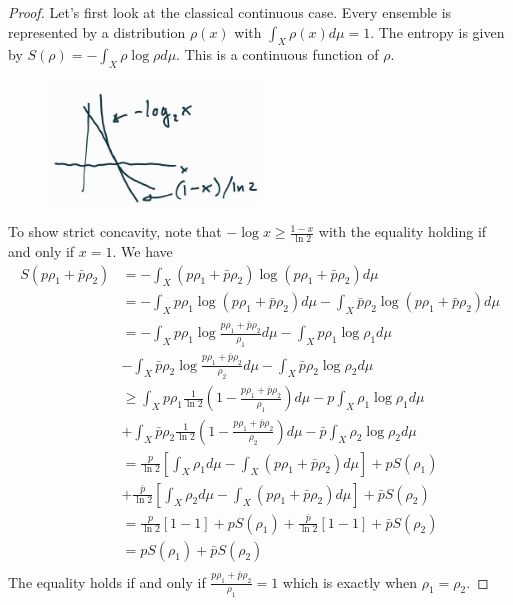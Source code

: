 \begin{proof}
	Let's first look at the classical continuous case. Every ensemble is represented by a distribution $\rho(x)$ with $\int_X \rho(x) d\mu=1$. The entropy is given by $S(\rho) = - \int_X \rho \log \rho d\mu$. This is a continuous function of $\rho$.
	
\begin{figure}[h]
	\centering
	\includegraphics[width=0.5\textwidth]{tempimages/LogBound.jpg}
\end{figure}
	
	To show strict concavity, note that $- \log x \geq \frac{1-x}{\ln 2}$ with the equality holding if and only if $x=1$. We have
	\begin{equation}
		\begin{aligned}
			S(p\rho_1 + \bar{p}\rho_2) &= - \int_X \left(p\rho_1 + \bar{p}\rho_2\right) \log \left(p\rho_1 + \bar{p}\rho_2\right) d\mu \\
			&= - \int_X p\rho_1 \log \left(p\rho_1 + \bar{p}\rho_2\right) d\mu - \int_X \bar{p}\rho_2 \log \left(p\rho_1 + \bar{p}\rho_2\right) d\mu \\
			&= - \int_X p\rho_1 \log \frac{p\rho_1 + \bar{p}\rho_2}{\rho_1} d\mu - \int_X p\rho_1 \log \rho_1 d\mu \\
			&- \int_X \bar{p}\rho_2 \log \frac{p\rho_1 + \bar{p}\rho_2}{\rho_2} d\mu - \int_X \bar{p}\rho_2 \log \rho_2 d\mu \\
			&\geq \int_X p\rho_1 \frac{1}{\ln 2} \left(1 - \frac{p\rho_1 + \bar{p}\rho_2}{\rho_1} \right)   d\mu - p \int_X \rho_1 \log \rho_1 d\mu \\
			&+ \int_X \bar{p}\rho_2 \frac{1}{\ln 2} \left(1 - \frac{p\rho_1 + \bar{p}\rho_2}{\rho_2} \right)   d\mu - \bar{p} \int_X \rho_2 \log \rho_2 d\mu \\
			&= \frac{p}{\ln 2}\left[ \int_X \rho_1 d\mu - \int_X \left(p\rho_1 + \bar{p}\rho_2\right) d\mu  \right] + p S(\rho_1) \\
			&+ \frac{\bar{p}}{\ln 2}\left[ \int_X \rho_2 d\mu - \int_X \left(p\rho_1 + \bar{p}\rho_2\right) d\mu  \right] + \bar{p} S(\rho_2) \\
			&= \frac{p}{\ln 2}\left[ 1 - 1  \right] + p S(\rho_1) + \frac{\bar{p}}{\ln 2}\left[ 1 - 1 \right] + \bar{p} S(\rho_2) \\
			&= p S(\rho_1) + \bar{p} S(\rho_2) \\
		\end{aligned}
	\end{equation}
	The equality holds if and only if $\frac{p\rho_1 + \bar{p}\rho_2}{\rho_1} = 1$ which is exactly when $\rho_1 = \rho_2$.
		

\end{proof}
